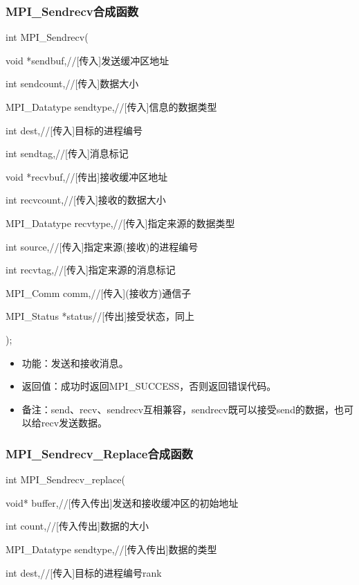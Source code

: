 \documentclass[UTF8]{article}%
\begin{document}
\subsubsection{MPI\_Sendrecv合成函数}

int MPI\_Sendrecv(
  
    \qquad void         *sendbuf,//[传入]发送缓冲区地址
    
    \qquad int          sendcount,//[传入]数据大小

    \qquad MPI\_Datatype sendtype,//[传入]信息的数据类型

    \qquad int          dest,//[传入]目标的进程编号

    \qquad int          sendtag,//[传入]消息标记

    \qquad void         *recvbuf,//[传出]接收缓冲区地址

    \qquad int          recvcount,//[传入]接收的数据大小

    \qquad MPI\_Datatype recvtype,//[传入]指定来源的数据类型

    \qquad int          source,//[传入]指定来源(接收)的进程编号

    \qquad int          recvtag,//[传入]指定来源的消息标记

    \qquad MPI\_Comm     comm,//[传入](接收方)通信子

    \qquad MPI\_Status   *status//[传出]接受状态，同上

);

\begin{itemize}
    \item 功能：发送和接收消息。
    \item 返回值：成功时返回MPI\_SUCCESS，否则返回错误代码。
    \item 备注：send、recv、sendrecv互相兼容，sendrecv既可以接受send的数据，也可以给recv发送数据。
\end{itemize}

\subsubsection{MPI\_Sendrecv\_Replace合成函数}

int MPI\_Sendrecv\_replace(

    \qquad void* buffer,//[传入传出]发送和接收缓冲区的初始地址

    \qquad int count,//[传入传出]数据的大小

    \qquad MPI\_Datatype sendtype,//[传入传出]数据的类型

    \qquad int dest,//[传入]目标的进程编号rank
\end{document}
